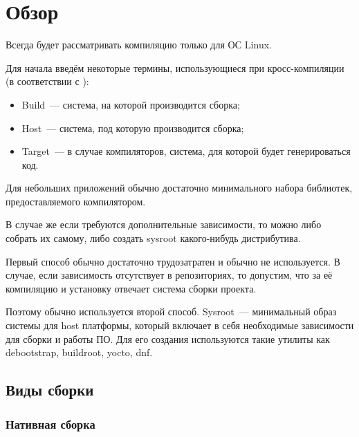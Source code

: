 
\section{Обзор}
\label{sec:relatedworks}

Всегда будет рассматривать компиляцию только для ОС Linux.

Для начала введём некоторые термины, использующиеся при кросс-компиляции (в соответствии с \cite{CrossCompilationAutomake}):
\begin{itemize}
	\item Build~--- система, на которой производится сборка;
	\item Host~--- система, под которую производится сборка;
	\item Target~--- в случае компиляторов, система, для которой будет генерироваться код.
\end{itemize}



Для небольших приложений  обычно достаточно минимального набора библиотек, предоставляемого компилятором.

В случае же если требуются дополнительные зависимости, то можно либо собрать их самому, либо создать sysroot какого-нибудь дистрибутива.

Первый способ обычно достаточно трудозатратен и обычно не используется.
В случае, если зависимость отсутствует в репозиториях, то допустим, что за её компиляцию и установку отвечает система сборки проекта.

Поэтому обычно используется второй способ.
Sysroot~--- минимальный образ системы для host платформы, который включает в себя необходимые зависимости для сборки и работы ПО. 
Для его создания используются такие утилиты как debootstrap, buildroot, yocto, dnf. 

\subsection{Виды сборки}

\subsubsection{Нативная сборка}

